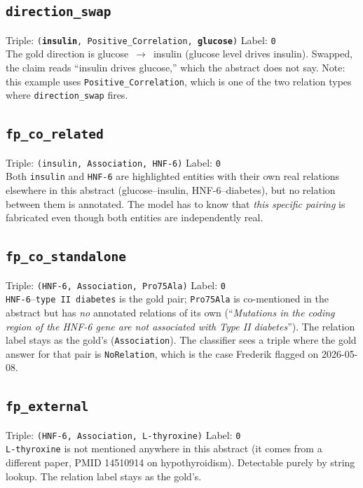 \documentclass[11pt,a4paper]{article}
\newcommand{\code}[1]{\texttt{#1}}
\begin{document}
\subsection*{\code{direction\_swap}}
Triple: \code{(\textbf{insulin}, Positive\_Correlation, \textbf{glucose})} \hfill Label: \code{0}\\
The gold direction is glucose~$\to$~insulin (glucose level drives insulin). Swapped, the claim reads ``insulin drives glucose,'' which the abstract does not say. Note: this example uses \code{Positive\_Correlation}, which is one of the two relation types where \code{direction\_swap} fires.

\subsection*{\code{fp\_co\_related}}
Triple: \code{(insulin, Association, HNF-6)} \hfill Label: \code{0}\\
Both \code{insulin} and \code{HNF-6} are highlighted entities with their own real relations elsewhere in this abstract (glucose--insulin, HNF-6--diabetes), but no relation between them is annotated. The model has to know that \emph{this specific pairing} is fabricated even though both entities are independently real.

\subsection*{\code{fp\_co\_standalone}}
Triple: \code{(HNF-6, Association, Pro75Ala)} \hfill Label: \code{0}\\
\code{HNF-6}--\code{type II diabetes} is the gold pair; \code{Pro75Ala} is co-mentioned in the abstract but has \emph{no} annotated relations of its own (``\emph{Mutations in the coding region of the HNF-6 gene are not associated with Type II diabetes}''). The relation label stays as the gold's (\code{Association}). The classifier sees a triple where the gold answer for that pair is \code{NoRelation}, which is the case Frederik flagged on 2026-05-08.

\subsection*{\code{fp\_external}}
Triple: \code{(HNF-6, Association, L-thyroxine)} \hfill Label: \code{0}\\
\code{L-thyroxine} is not mentioned anywhere in this abstract (it comes from a different paper, PMID 14510914 on hypothyroidism). Detectable purely by string lookup. The relation label stays as the gold's.
\end{document}
